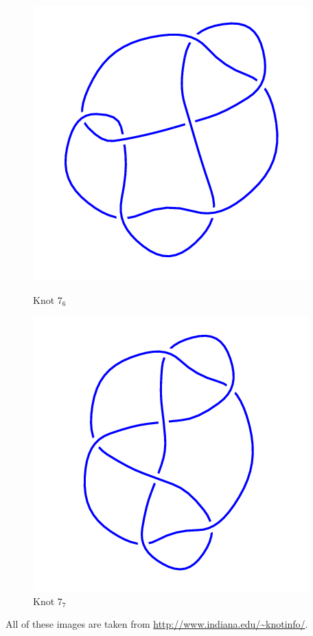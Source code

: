 \documentclass{article}
\begin{document}
\begin{figure}[!htb]
\includegraphics[width=\linewidth]{7_6.png}
\caption{Knot $7_6$}
\endminipage\hfill
{}
\includegraphics[width=\linewidth]{7_7.png}
\caption{Knot $7_7$}
\endminipage\hfill
\end{figure}

All of these images are taken from \url{http://www.indiana.edu/~knotinfo/}.
\end{document}
